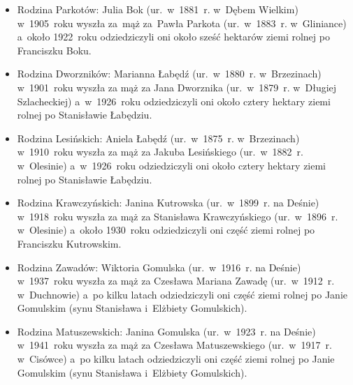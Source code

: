 \begin{itemize}
    \item Rodzina Parkotów: Julia Bok (ur.~w~1881~r. w~Dębem Wielkim)
    w~1905~roku wyszła za~mąż za~Pawła Parkota (ur.~w~1883~r. w~Gliniance)
    a~około 1922~roku odziedziczyli oni około sześć hektarów ziemi rolnej po
    Franciszku Boku.
    \item Rodzina Dworzników: Marianna Łabędź (ur.~w~1880~r. w~Brzezinach)
    w~1901~roku wyszła za mąż za Jana Dworznika (ur.~w~1879~r. w~Długiej
    Szlacheckiej) a~w~1926~roku odziedziczyli oni około cztery hektary ziemi
    rolnej po Stanisławie Łabędziu.
    \item Rodzina Lesińskich: Aniela Łabędź (ur.~w~1875~r. w~Brzezinach)
    w~1910~roku wyszła za mąż za Jakuba Lesińskiego (ur.~w~1882~r.
    w~Olesinie) a~w~1926~roku odziedziczyli oni około cztery hektary ziemi
    rolnej po Stanisławie Łabędziu.
    \item Rodzina Krawczyńskich: Janina Kutrowska (ur.~w~1899~r. na Deśnie)
    w~1918~roku wyszła za mąż za Stanisława Krawczyńskiego (ur.~w~1896~r.
    w~Olesinie) a~około 1930~roku odziedziczyli oni część ziemi rolnej po
    Franciszku Kutrowskim.
    \item Rodzina Zawadów: Wiktoria Gomulska (ur.~w~1916~r. na Deśnie)
    w~1937~roku wyszła za mąż za Czesława Mariana Zawadę (ur.~w~1912~r.
    w~Duchnowie) a~po kilku latach odziedziczyli oni część ziemi rolnej po
    Janie Gomulskim (synu Stanisława i~Elżbiety Gomulskich).
    \item Rodzina Matuszewskich: Janina Gomulska (ur.~w~1923~r. na Deśnie)
    w~1941~roku wyszła za mąż za Czesława Matuszewskiego (ur.~w~1917~r.
    w~Cisówce) a~po kilku latach odziedziczyli oni część ziemi rolnej po Janie
    Gomulskim (synu Stanisława i~Elżbiety Gomulskich).
\end{itemize}

